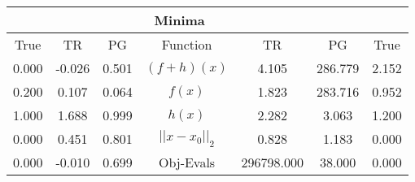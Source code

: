 \begin{tabular}{| c |c |c || c |c |c |c |}
    \hline
    \rowcolor[gray]{0.9}
\multicolumn{3}{|c|}{Parameters} & \multicolumn{4}{|c|}{Minima}\\ \hline True & TR & PG  & Function & TR & PG & True \\
    \hline
  \rowcolor[gray]{0.7}
  0.000 & -0.026 & 0.501   & $ (f + h)(x) $ & 4.105 & 286.779 & 2.152 \\
  \rowcolor[gray]{0.8}
  0.200 & 0.107 & 0.064   & $ f(x) $ & 1.823 & 283.716 & 0.952 \\
  \rowcolor[gray]{0.7}
  1.000 & 1.688 & 0.999   & $ h(x) $ & 2.282 & 3.063 & 1.200 \\
  \rowcolor[gray]{0.8}
  0.000 & 0.451 & 0.801   & $ ||x - x_0||_2 $ & 0.828 & 1.183 & 0.000 \\
  \rowcolor[gray]{0.7}
  0.000 & -0.010 & 0.699   & Obj-Evals & 296798.000 & 38.000 & 0.000 \\
\end{tabular}
